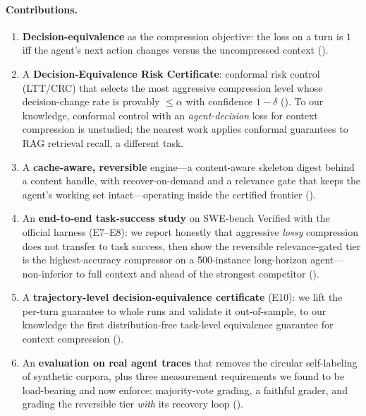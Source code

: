 \documentclass{article}
\begin{document}
\paragraph{Contributions.}
\begin{enumerate}
  \item \textbf{Decision-equivalence} as the compression objective: the loss on a
  turn is $1$ iff the agent's next action changes versus the uncompressed context
  ().
  \item A \textbf{Decision-Equivalence Risk Certificate}: conformal risk control
  (LTT/CRC) that selects the most aggressive compression level whose decision-change
  rate is provably $\le \alpha$ with confidence $1-\delta$ (). To
  our knowledge, conformal control with an \emph{agent-decision} loss for context
  compression is unstudied; the nearest work applies conformal guarantees to RAG
  retrieval recall, a different task.
  \item A \textbf{cache-aware, reversible} engine---a content-aware skeleton digest
  behind a content handle, with recover-on-demand and a relevance gate that keeps the
  agent's working set intact---operating inside the certified frontier ().
  \item An \textbf{end-to-end task-success study} on SWE-bench Verified with the official
  harness (E7--E8): we report honestly that aggressive \emph{lossy} compression does not
  transfer to task success, then show the reversible relevance-gated tier is the
  highest-accuracy compressor on a 500-instance long-horizon agent---non-inferior to full
  context and ahead of the strongest competitor ().
  \item A \textbf{trajectory-level decision-equivalence certificate} (E10): we lift the
  per-turn guarantee to whole runs and validate it out-of-sample, to our knowledge the first
  distribution-free task-level equivalence guarantee for context compression ().
  \item An \textbf{evaluation on real agent traces} that removes the circular
  self-labeling of synthetic corpora, plus three measurement requirements we found
  to be load-bearing and now enforce: majority-vote grading, a faithful grader, and
  grading the reversible tier \emph{with} its recovery loop ().
\end{enumerate}
\end{document}
